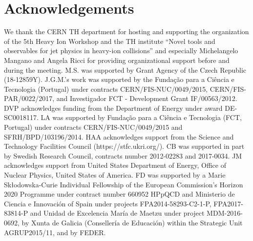 \documentclass{article}
\begin{document}
\section*{Acknowledgements} 
We thank the CERN TH department for hosting and supporting the organization of the 5th Heavy Ion Workshop and the TH institute ``Novel tools and observables for jet physics in heavy-ion collisions'' and especially Michelangelo Mangano and Angela Ricci for providing organizational support before and during the meeting.
M.S. was supported by Grant Agency of the Czech Republic (18-12859Y).
J.G.M.'s work was supported  by the Funda{\c c}{\~ a}o para a Ci{\^ e}ncia e Tecnologia (Portugal) under contracts CERN/FIS-NUC/0049/2015, CERN/FIS-PAR/0022/2017, and Investigador FCT - Development Grant IF/00563/2012.
DVP acknowledges funding from the Department of Energy under award DE-SC0018117.
LA was supported by Funda{\c c}{\~ a}o para a Ci{\^ e}ncia e Tecnologia (FCT, Portugal) under contracts CERN/FIS-NUC/0049/2015 and SFRH/BPD/103196/2014.
HAA acknowledges support from the Science and Technology Facilities Council (https://stfc.ukri.org/).
CB was supported in part by Swedish Research Council, contracts number 2012-02283 and 2017-0034.
JM acknowledges support from United States Department of Energy, Office of Nuclear Physics, United States of America.
FD was supported by a Marie Sk\l{}odowska-Curie Individual Fellowship of the European Commission's Horizon 2020 Programme under contract number 660952 HPpQCD and Ministerio de Ciencia e Innovaci{\' o}n of Spain under projects FPA2014-58293-C2-1-P, FPA2017-83814-P and Unidad de Excelencia Mar{\' i}a de Maetzu under project MDM-2016-0692, by Xunta de Galicia (Conseller{\' i}a de Educaci{\' o}n) within the Strategic Unit AGRUP2015/11, and by FEDER.

\appendix




\end{document}
